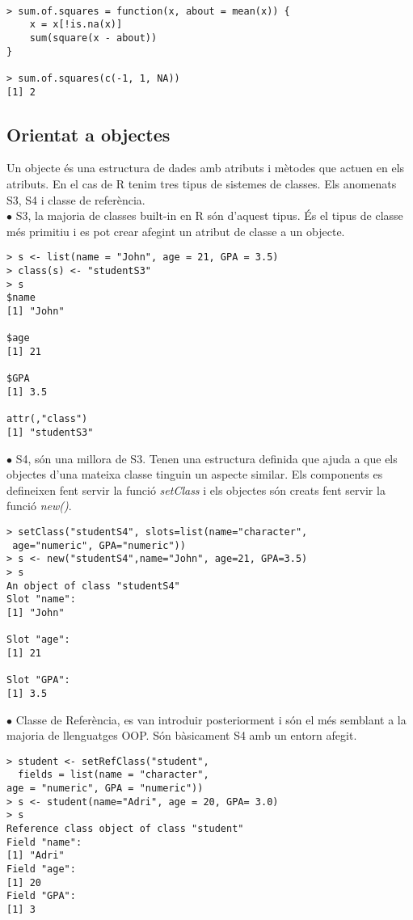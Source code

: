 \documentclass[12pt]{article}
\begin{document}
\begin{verbatim}

> sum.of.squares = function(x, about = mean(x)) {
	x = x[!is.na(x)]
	sum(square(x - about))
}

> sum.of.squares(c(-1, 1, NA))
[1] 2

\end{verbatim}


\subsection{Orientat a objectes}
Un objecte és una estructura de dades amb atributs i mètodes que actuen en els atributs. En el cas de R tenim tres tipus de sistemes de classes. Els anomenats S3, S4 i classe de referència.\\

\medskip
\noindent $\bullet$ S3, la majoria de classes built-in en R són d'aquest tipus. És el tipus de classe més primitiu i es pot crear afegint un atribut de classe a un objecte. 

\begin{verbatim}
> s <- list(name = "John", age = 21, GPA = 3.5)
> class(s) <- "studentS3"
> s
$name
[1] "John"

$age
[1] 21

$GPA
[1] 3.5

attr(,"class")
[1] "studentS3"
\end{verbatim}
\medskip
$\bullet$ S4, són una millora de S3. Tenen una estructura definida que ajuda a que els objectes d'una mateixa classe tinguin un aspecte similar. Els components es defineixen fent servir la funció \textit{setClass} i els objectes són creats fent servir la funció \textit{new()}. 

\begin{verbatim}
> setClass("studentS4", slots=list(name="character",
 age="numeric", GPA="numeric"))
> s <- new("studentS4",name="John", age=21, GPA=3.5)
> s
An object of class "studentS4"
Slot "name":
[1] "John"

Slot "age":
[1] 21

Slot "GPA":
[1] 3.5
\end{verbatim}
\medskip
$\bullet$ Classe de Referència, es van introduir posteriorment i són el més semblant a la majoria de llenguatges OOP. Són bàsicament S4 amb un entorn afegit.  

\begin{verbatim}
> student <- setRefClass("student",
  fields = list(name = "character", 
age = "numeric", GPA = "numeric"))
> s <- student(name="Adri", age = 20, GPA= 3.0)
> s
Reference class object of class "student"
Field "name":
[1] "Adri"
Field "age":
[1] 20
Field "GPA":
[1] 3
\end{verbatim}
\end{document}
